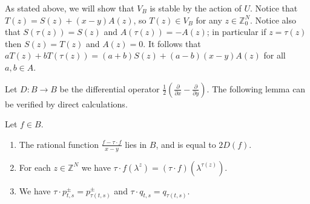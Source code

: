\documentclass[11pt,fleqn]{article}
\newcommand\ZZ{\mathbb Z}
\renewcommand\to{\longrightarrow}
\begin{document}
As stated above, we will show that $V_B$ is stable by the action of $U$.
Notice that $T(z) = S(z) + (x-y)A(z)$, so $T(z) \in V_B$ for any $z \in 
\ZZ^N_0$. Notice also that $S(\tau(z)) = S(z)$ and $A(\tau(z)) = - A(z)$; 
in particular if $z = \tau(z)$ then $S(z) = T(z)$ and $A(z) = 0$. It follows 
that $a T(z) + b T(\tau(z)) = (a+b) S(z) + (a-b)(x-y)A(z)$ for all $a, b \in 
A$.

Let $D: B \to B$ be the differential operator $\frac{1}{2} \left(
\frac{\partial}{\partial x} - \frac{\partial}{\partial y} \right)$. The 
following lemma can be verified by direct calculations. 
\begin{Lemma}
\label{L:helpful}
Let $f \in B$.
\begin{enumerate}
\item 
\label{derivative}
The rational function $\frac{f - \tau \cdot f}{x-y}$ lies in $B$, and is equal
to $2 D(f)$.

\item 
\label{action1}
For each $z \in \ZZ^N$ we have $\tau \cdot f(\lambda^z) = (\tau \cdot f)
(\lambda^{\tau(z)})$. 

\item 
\label{action2}
We have $\tau \cdot p_{t,s}^\pm = p_{\tau(t,s)}^\pm$ and $\tau \cdot 
q_{t,s} = q_{\tau(t,s)}$.
\end{enumerate}
\end{Lemma}
\end{document}
